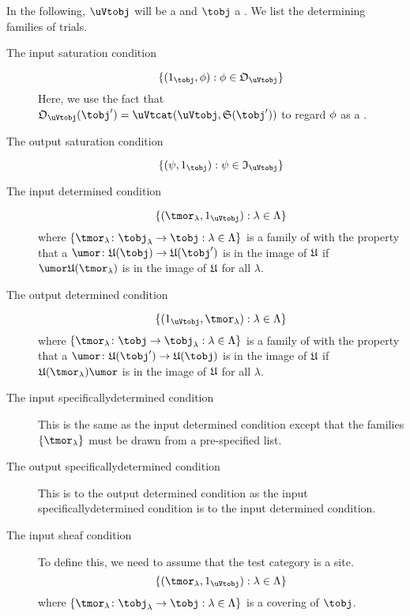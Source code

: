 \documentclass[%
a4paper,%
arxiv,%
defaults
]{myclass}
\begin{document}
\begin{defn}
In the following, \(\uVtobj\) will be a \uVtobj and \(\tobj\) a \tobj.
We list the determining families of trials.

\begin{description}
\item[The input saturation condition]
%
\[
  \{(1_{\tobj}, \ofn) : \ofn \in \otest_{\uVtobj}\}
\]
%
Here, we use the fact that \(\otest_{\uVtobj}(\tobj') = \Hom{\uVtcat}{\uVtobj}{\sfunc(\tobj')}\) to regard \(\phi\) as a \uVtmor.

\item[The output saturation condition]
%
\[
  \{(\ifn, 1_{\tobj}) : \ifn \in \itest_{\uVtobj}\}
\]
%

\item[The input determined condition]
%
\[
  \{(\tmor_\lambda, 1_{\uVtobj}) : \lambda \in \Lambda\}
\]
%
where \(\{\tmor_\lambda \colon \tobj_\lambda \to \tobj : \lambda \in \Lambda\}\) is a family of \tmors with the property that a \umor \(\umor \colon \ufunc(\tobj) \to \ufunc(\tobj')\) is in the image of \(\ufunc\) if \(\umor \ufunc(\tmor_\lambda)\) is in the image of \(\ufunc\) for all \(\lambda\).

\item[The output determined condition]
%
\[
  \{(1_{\uVtobj}, \tmor_\lambda) : \lambda \in \Lambda\}
\]
%
where \(\{\tmor_\lambda \colon \tobj \to \tobj_\lambda : \lambda \in \Lambda\}\) is a family of \tmors with the property that a \umor \(\umor \colon \ufunc(\tobj') \to \ufunc(\tobj)\) is in the image of \(\ufunc\) if \( \ufunc(\tmor_\lambda) \umor\) is in the image of \(\ufunc\) for all \(\lambda\).

\item[The input specifically\enhyp{}determined condition]
This is the same as the input determined condition except that the families \(\{\tmor_\lambda\}\) must be drawn from a pre\hyp{}specified list.

\item[The output specifically\enhyp{}determined condition]
This is to the output determined condition as the input specifically\enhyp{}determined condition is to the input determined condition.

\item[The input sheaf condition]
To define this, we need to assume that the test category is a site.
%
\[
  \{(\tmor_\lambda, 1_{\uVtobj}) : \lambda \in \Lambda\}
\]
%
where \(\{\tmor_\lambda \colon \tobj_\lambda \to \tobj : \lambda \in \Lambda\}\) is a covering of \(\tobj\).


\end{description}
\end{defn}
\end{document}

